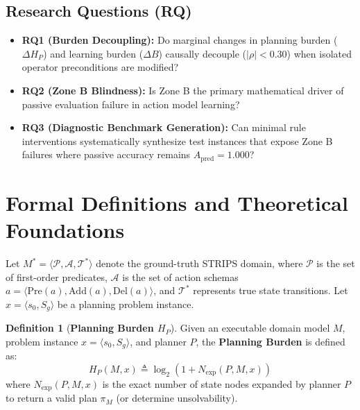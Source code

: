 \documentclass[11pt,a4paper]{article}
\theoremstyle{definition}
\newtheorem{definition}{Definition}
\begin{document}
\subsection{Research Questions (RQ)}
\begin{itemize}[leftmargin=*]
    \item \textbf{RQ1 (Burden Decoupling):} Do marginal changes in planning burden ($\Delta H_P$) and learning burden ($\Delta B$) causally decouple ($|\rho| < 0.30$) when isolated operator preconditions are modified?
    \item \textbf{RQ2 (Zone B Blindness):} Is Zone B the primary mathematical driver of passive evaluation failure in action model learning?
    \item \textbf{RQ3 (Diagnostic Benchmark Generation):} Can minimal rule interventions systematically synthesize test instances that expose Zone B failures where passive accuracy remains $A_{\text{pred}} = 1.000$?
\end{itemize}

\section{Formal Definitions and Theoretical Foundations}

Let $M^* = \langle \mathcal{P}, \mathcal{A}, \mathcal{T}^* \rangle$ denote the ground-truth STRIPS domain, where $\mathcal{P}$ is the set of first-order predicates, $\mathcal{A}$ is the set of action schemas $a = \langle \text{Pre}(a), \text{Add}(a), \text{Del}(a) \rangle$, and $\mathcal{T}^*$ represents true state transitions. Let $x = \langle s_0, S_g \rangle$ be a planning problem instance.

\begin{definition}[\textbf{Planning Burden $H_P$}]
Given an executable domain model $M$, problem instance $x = \langle s_0, S_g \rangle$, and planner $P$, the \textbf{Planning Burden} is defined as:
\begin{equation}
H_P(M, x) \triangleq \log_2(1 + N_{\text{exp}}(P, M, x))
\end{equation}
where $N_{\text{exp}}(P, M, x)$ is the exact number of state nodes expanded by planner $P$ to return a valid plan $\pi_M$ (or determine unsolvability).
\end{definition}
\end{document}
